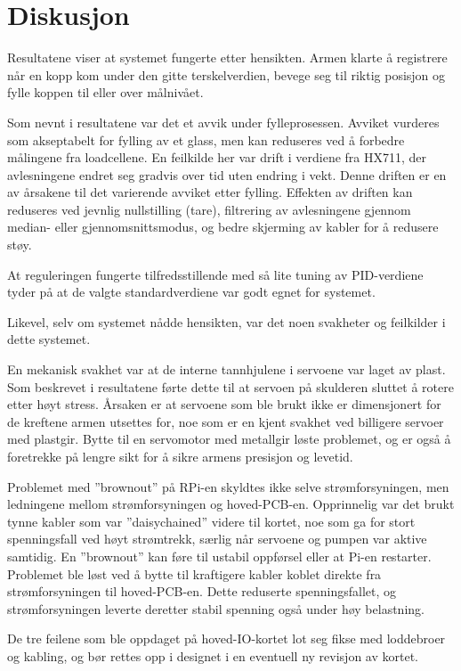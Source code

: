 \section{Diskusjon}
Resultatene viser at systemet fungerte etter hensikten. Armen klarte å registrere når en kopp kom under den gitte terskelverdien, bevege seg til riktig posisjon og fylle koppen til eller over målnivået.

Som nevnt i resultatene var det et avvik under fylleprosessen. Avviket vurderes som akseptabelt for fylling av et glass, men kan reduseres ved å forbedre målingene fra loadcellene. En feilkilde her var drift i verdiene fra HX711, der avlesningene endret seg gradvis over tid uten endring i vekt. Denne driften er en av årsakene til det varierende avviket etter fylling. Effekten av driften kan reduseres ved jevnlig nullstilling (tare), filtrering av avlesningene gjennom median- eller gjennomsnittsmodus, og bedre skjerming av kabler for å redusere støy.

At reguleringen fungerte tilfredsstillende med så lite tuning av PID-verdiene tyder på at de valgte standardverdiene var godt egnet for systemet.
 
Likevel, selv om systemet nådde hensikten, var det noen svakheter og feilkilder i dette systemet.

En mekanisk svakhet var at de interne tannhjulene i servoene var laget av plast. Som beskrevet i resultatene førte dette til at servoen på skulderen sluttet å rotere etter høyt stress. Årsaken er at servoene som ble brukt ikke er dimensjonert for de kreftene armen utsettes for, noe som er en kjent svakhet ved billigere servoer med plastgir. Bytte til en servomotor med metallgir løste problemet, og er også å foretrekke på lengre sikt for å sikre armens presisjon og levetid. 

Problemet med ''brownout'' på RPi-en skyldtes ikke selve strømforsyningen, men ledningene mellom strømforsyningen og hoved-PCB-en. Opprinnelig var det brukt tynne kabler som var ''daisychained'' videre til kortet, noe som ga for stort spenningsfall ved høyt strømtrekk, særlig når servoene og pumpen var aktive samtidig. En ''brownout'' kan føre til ustabil oppførsel eller at Pi-en restarter. Problemet ble løst ved å bytte til kraftigere kabler koblet direkte fra strømforsyningen til hoved-PCB-en. Dette reduserte spenningsfallet, og strømforsyningen leverte deretter stabil spenning også under høy belastning.

De tre feilene som ble oppdaget på hoved-IO-kortet lot seg fikse med loddebroer og kabling, og bør rettes opp i designet i en eventuell ny revisjon av kortet.

